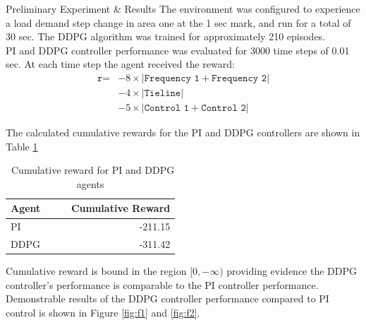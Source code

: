 \documentclass[final]{beamer}
\newlength{\onecolwid}
\begin{document}
\begin{frame}[t]
\begin{columns}[t]
\begin{column}{\onecolwid}
\vspace{-1.5cm}
\begin{block}{Preliminary Experiment \& Results}
	The environment was configured to experience a load demand step change in area one at the 1 sec mark, and run for a total of 30 sec. The DDPG algorithm was trained for approximately 210 episodes. \\
	\vspace{0.75cm}
	PI and DDPG controller performance was evaluated for 3000 time steps of 0.01 sec.  At each time step the agent received the reward:
	\vspace{0.75cm}
	\begin{equation*}
	\begin{split}
		\texttt{r} = &- 8 \times |\texttt{Frequency 1} + \texttt{Frequency 2}| \\
			  &- 4 \times |\texttt{Tieline}| \\
			  &- 5 \times |\texttt{Control 1} + \texttt{Control 2}|
	\end{split}
	\end{equation*}
	
	\vspace{0.75cm}
	
	The calculated cumulative rewards for the PI and DDPG controllers are shown in Table \ref{tab:1}
	
	\begin{table}
	\caption{ \ Cumulative reward for PI and DDPG agents}
	\label{tab:1}
		\begin{tabular}{lr}
		\toprule
		\textbf{Agent} \ \ \ & \textbf{Cumulative Reward} \\
		\midrule
		 PI & -211.15 \\
		 DDPG & -311.42 \\
		\bottomrule
		\end{tabular}
	\end{table}
	\vspace{0.75cm}
	Cumulative reward is bound in the region $[0, -\infty)$ providing evidence the DDPG controller's performance is comparable to the PI controller performance. Demonstrable results of the DDPG controller performance compared to PI control is shown in Figure \ref{fig:f1} and \ref{fig:f2}.
\end{block}

\vspace{-1cm}


\end{column}
\end{columns}
\end{frame}
\end{document}
